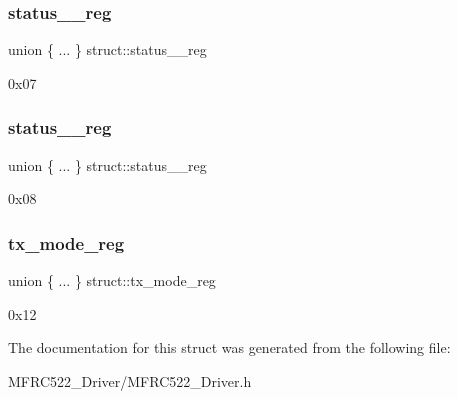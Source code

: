 \subsubsection{\texorpdfstring{status\+\_\+\_\+reg}{status\_1\_reg}}
{\footnotesize\ttfamily union \{ ... \}   struct\+::status\+\_\+\_\+reg}

0x07 \mbox{\label{structstruct_a01781aef0edd49d172a2b5df5ec1c138}} 
\subsubsection{\texorpdfstring{status\+\_\+\_\+reg}{status\_2\_reg}}
{\footnotesize\ttfamily union \{ ... \}   struct\+::status\+\_\+\_\+reg}

0x08 \mbox{\label{structstruct_a1dd825787c2f3275c00463af6fb446a8}} 
\subsubsection{\texorpdfstring{tx\+\_\+mode\+\_\+reg}{tx\_mode\_reg}}
{\footnotesize\ttfamily union \{ ... \}   struct\+::tx\+\_\+mode\+\_\+reg}

0x12 

The documentation for this struct was generated from the following file\+:\begin{DoxyCompactItemize}
\item 
M\+F\+R\+C522\+\_\+\+Driver/M\+F\+R\+C522\+\_\+\+Driver.\+h\end{DoxyCompactItemize}
